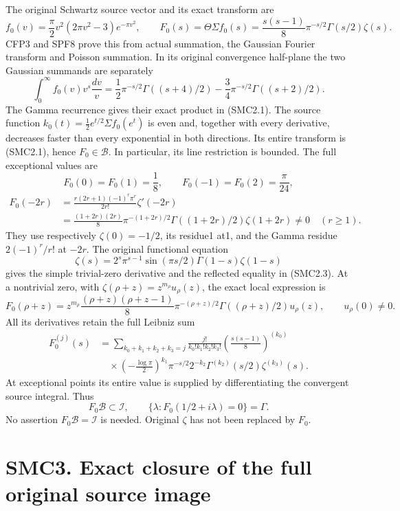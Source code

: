The original Schwartz source vector and its exact transform are \[
f_0(v)=\frac\pi2v^2(2\pi v^2-3)e^{-\pi v^2},
\qquad
F_0(s)=\Theta\Sigma f_0(s)
=\frac{s(s-1)}8\pi^{-s/2}\Gamma(s/2)\zeta(s).
\tag{SMC2.1}
\] CFP3 and SPF8 prove this from actual summation, the Gaussian Fourier
transform and Poisson summation. In its original convergence half-plane
the two Gaussian summands are separately \[
\int_0^\infty f_0(v)v^s\frac{dv}{v}
=\frac12\pi^{-s/2}\Gamma((s+4)/2)
-\frac34\pi^{-s/2}\Gamma((s+2)/2).
\tag{SMC2.2}
\] The Gamma recurrence gives their exact product in (SMC2.1). The
source function \(k_0(t)=\tfrac12 e^{t/2}\Sigma f_0(e^t)\) is even and,
together with every derivative, decreases faster than every exponential
in both directions. Its entire transform is (SMC2.1), hence
\(F_0\in\mathcal B\). In particular, its line restriction is bounded.
The full exceptional values are \[
F_0(0)=F_0(1)=\frac18,\qquad F_0(-1)=F_0(2)=\frac\pi{24},
\] \[
\begin{aligned}
F_0(-2r)&=\frac{r(2r+1)(-1)^r\pi^r}{2r!}\zeta'(-2r)
\\&=\frac{(1+2r)(2r)}8\pi^{-(1+2r)/2}
\Gamma((1+2r)/2)\zeta(1+2r)\ne0\quad(r\ge1).
\end{aligned}
\tag{SMC2.3}
\] They use respectively \(\zeta(0)=-1/2\), its residue1 at1, and the
Gamma residue \(2(-1)^r/r!\) at \(-2r\). The original functional
equation \[
\zeta(s)=2^s\pi^{s-1}\sin(\pi s/2)\Gamma(1-s)\zeta(1-s)
\tag{SMC2.4}
\] gives the simple trivial-zero derivative and the reflected equality
in (SMC2.3). At a nontrivial zero, with
\(\zeta(\rho+z)=z^{m_\rho}u_\rho(z)\), the exact local expression is \[
F_0(\rho+z)=z^{m_\rho}\frac{(\rho+z)(\rho+z-1)}8
\pi^{-(\rho+z)/2}\Gamma((\rho+z)/2)u_\rho(z),
\qquad u_\rho(0)\ne0.
\tag{SMC2.5}
\] All its derivatives retain the full Leibniz sum \[
\begin{aligned}
F_0^{(j)}(s)&=\sum_{k_0+k_1+k_2+k_3=j}
\frac{j!}{k_0!k_1!k_2!k_3!}
\left(\frac{s(s-1)}8\right)^{(k_0)}
\\&\quad{}\times \left(-\frac{\log\pi}{2}\right)^{k_1}\pi^{-s/2}
2^{-k_2}\Gamma^{(k_2)}(s/2)\zeta^{(k_3)}(s).
\end{aligned}
\tag{SMC2.6}
\] At exceptional points its entire value is supplied by differentiating
the convergent source integral. Thus \[
F_0\mathcal B\subset\mathcal I,
\qquad\{\lambda:F_0(1/2+i\lambda)=0\}=\Gamma.
\tag{SMC2.7}
\] No assertion \(F_0\mathcal B=\mathcal I\) is needed. Original
\(\zeta\) has not been replaced by \(F_0\).

\section{SMC3. Exact closure of the full original source
image}\label{smc3.-exact-closure-of-the-full-original-source-image}

